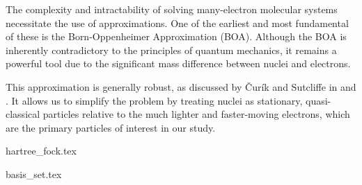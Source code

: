 


\newpage
The complexity and intractability of solving many-electron molecular systems
necessitate the use of approximations. One of the earliest and most fundamental
of these is the Born-Oppenheimer Approximation (\gls{BOA}). Although the BOA is
inherently contradictory to the principles of quantum mechanics, it remains a
powerful tool due to the significant mass difference between nuclei and
electrons.

\vspace{0.5cm}%


This approximation is generally robust, as discussed by \v{C}urík and
Sutcliffe in \cite{urk2018} and \cite{Sutcliffe}. It allows us to
simplify the problem by treating nuclei as stationary, quasi-classical
particles relative to the much lighter and faster-moving electrons, which are
the primary particles of interest in our study.

{hartree_fock.tex}

{basis_set.tex}

